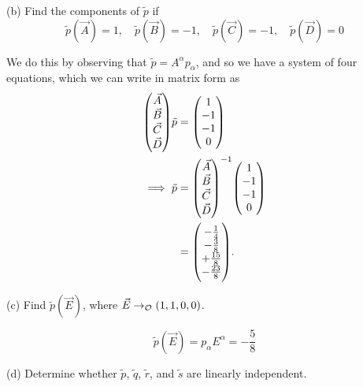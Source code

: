 \documentclass[gr-notes.tex]{subfiles}
\begin{document}
(b) Find the components of $\tilde{p}$ if
%
\begin{displaymath}
  \tilde{p}(\vec{A}) =  1, \quad
  \tilde{p}(\vec{B}) = -1, \quad
  \tilde{p}(\vec{C}) = -1, \quad
  \tilde{p}(\vec{D}) =  0
\end{displaymath}

We do this by observing that $\tilde{p} = A^\alpha p_\alpha$, and so we have a system of four equations, which we can write in matrix form as
%
\begin{align*}
  \mqty( \vec{A} \\ \vec{B} \\ \vec{C} \\ \vec{D} ) \tilde{p} &=
  \mqty( 1 \\ -1 \\ -1 \\ 0 )
  \\ \implies
  \tilde{p} &=
  \mqty( \vec{A} \\ \vec{B} \\ \vec{C} \\ \vec{D} )^{-1}
  \mqty( 1 \\ -1 \\ -1 \\ 0 )
  \\ &=
  \mqty( -\frac{1}{4} \\ -\frac{3}{8} \\ +\frac{15}{8} \\ -\frac{23}{8} ).
\end{align*}

(c) Find $\tilde{p}(\vec{E})$, where $\vec{E} \to_{\mathcal{O}} (1, 1, 0, 0)$.

\begin{displaymath}
  \tilde{p}(\vec{E}) = p_\alpha E^\alpha = -\frac{5}{8}
\end{displaymath}

(d) Determine whether $\tilde{p}$, $\tilde{q}$, $\tilde{r}$, and $\tilde{s}$ are linearly independent.
\end{document}
